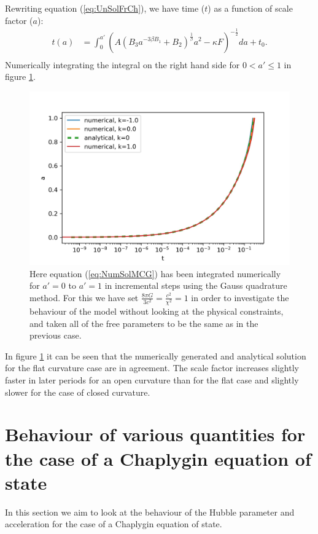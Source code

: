 \documentclass[a4paper, 11pt]{FSKH_623_Report}
\numberwithin{equation}{section}
\newcommand{\brac}[1]{\left(#1\right)}
\begin{document}
Rewriting equation (\ref{eq:UnSolFrCh}), we have time ($t$) as a function of scale factor ($a$):
\begin{equation}\label{eq:NumSolMCG}
\begin{split}
t(a) &= \int_{0}^{a'}\brac{A\brac{B_{3}a^{-3\beta B_{1}}+B_{2}}^{\frac{1}{\beta}} a^{2}-\kappa F}^{-\frac{1}{2}}da + t_{0}.        \\
\end{split}
\end{equation}   
Numerically integrating the integral on the right hand side for $0<a'\leq 1$ in figure \ref{fig:ChScale}.
\begin{figure}[H]
\centering
\includegraphics[scale=1]{Figures/a_ch.jpg}
\caption{Here equation (\ref{eq:NumSolMCG}) has been integrated numerically for $a'=0$ to $a'=1$ in incremental steps using the Gauss quadrature method. For this we have set $\frac{8\pi G}{3c^{2}}=\frac{c^{2}}{\chi^{2}}=1$ in order to investigate the behaviour of the model without looking at the physical constraints, and taken all of the free parameters to be the same as in the previous case. }
\label{fig:ChScale}
\end{figure}
In figure \ref{fig:ChScale} it can be seen that the numerically generated and analytical solution for the flat curvature case are in agreement. The scale factor increases slightly faster in later periods for an open curvature than for the flat case and slightly slower for the case of closed curvature.
\section{Behaviour of various quantities for the case of a Chaplygin equation of state}
In this section we aim to look at the behaviour of the Hubble parameter and acceleration for the case of a Chaplygin equation of state.
\end{document}
